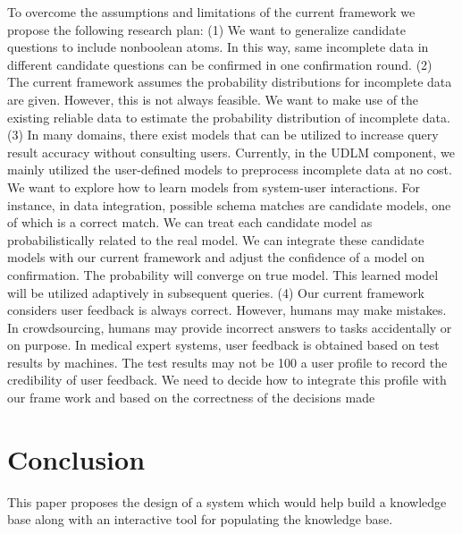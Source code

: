 \documentclass{vldb}
\begin{document}
To overcome the assumptions and limitations of the current
framework we propose the following research plan: (1)
We want to generalize candidate questions to include nonboolean
atoms. In this way, same incomplete data in different
candidate questions can be confirmed in one confirmation
round. (2) The current framework assumes the probability
distributions for incomplete data are given. However,
this is not always feasible. We want to make use of the existing
reliable data to estimate the probability distribution of
incomplete data. (3) In many domains, there exist models
that can be utilized to increase query result accuracy without
consulting users. Currently, in the UDLM component,
we mainly utilized the user-defined models to preprocess incomplete
data at no cost. We want to explore how to learn
models from system-user interactions. For instance, in data
integration, possible schema matches are candidate models,
one of which is a correct match. We can treat each candidate
model as probabilistically related to the real model. We can
integrate these candidate models with our current framework
and adjust the confidence of a model on confirmation.
The probability will converge on true model. This learned
model will be utilized adaptively in subsequent queries. (4)
Our current framework considers user feedback is always
correct. However, humans may make mistakes. In crowdsourcing,
humans may provide incorrect answers to tasks
accidentally or on purpose. In medical expert systems, user
feedback is obtained based on test results by machines. The
test results may not be 100%
a user profile to record the credibility of user feedback. We
need to decide how to integrate this profile with our frame work and based on the correctness of the decisions made


\section{Conclusion}
This paper proposes the design of a system which would help build a knowledge base along with an interactive tool for populating the knowledge base. 



\balance
\end{document}
